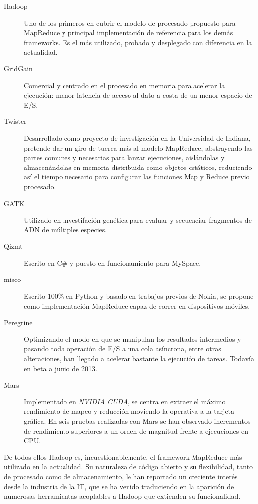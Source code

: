 \begin{description}
 \item[Hadoop] \cite{hadoopdefguide} Uno de los primeros en cubrir el modelo de procesado pro\-pues\-to para MapReduce y principal implementaci\'on de referencia para los dem\'as frameworks. Es el m\'as utilizado, probado y desplegado con diferencia en la actualidad.
 \item[GridGain] \cite{gridgainvshadoop} Comercial y centrado en el procesado en memoria para ace\-le\-rar la ejecuci\'on: menor latencia de acceso al dato a costa de un menor espacio de E/S.
 \item[Twister] \cite{twister} Desarrollado como proyecto de investigaci\'on en la Universidad de Indiana, pretende dar un giro de tuerca m\'as al modelo MapReduce, abstrayendo las partes comunes y necesarias para lanzar ejecuciones, aisl\'andolas y almacen\'andolas en memoria distribuida como objetos est\'aticos, reduciendo as\'i el tiempo necesario para configurar las funciones Map y Reduce previo procesado.
 \item[GATK] \cite{gatk} Utilizado en investifaci\'on gen\'etica para evaluar y secuenciar fragmentos de ADN de m\'ultiples especies.
 \item[Qizmt] \cite{qizmt} Escrito en C\# y puesto en funcionamiento para MySpace.
 \item[misco] \cite{misco} Escrito 100\% en Python y basado en trabajos previos de Nokia, se propone como implementaci\'on MapReduce capaz de correr en dispositivos m\'oviles.
 \item[Peregrine] \cite{peregrine} Optimizando el modo en que se manipulan los resultados intermedios y pasando toda operaci\'on de E/S a una cola as\'incrona, entre otras alteraciones, han llegado a acelerar bastante la ejecuci\'on de tareas. Todav\'ia en beta a junio de 2013.
 \item[Mars] \cite{mars} Implementado en \emph{NVIDIA CUDA}, se centra en extraer el m\'aximo rendimiento de mapeo y reducci\'on moviendo la operativa a la tarjeta gr\'afica. En seis pruebas realizadas con Mars se han observado incrementos de rendimiento superiores a un orden de magnitud frente a ejecuciones en CPU.

\end{description}

De todos ellos Hadoop es, incuestionablemente, el framework MapReduce m\'as utilizado en la actualidad. Su naturaleza de c\'odigo abierto y su flexibilidad, tanto de procesado como de almacenamiento, le han reportado un creciente inter\'es desde la industria de la IT, que se ha venido traduciendo en la aparici\'on de numerosas herramientas acoplables a Hadoop que extienden su funcionalidad.


